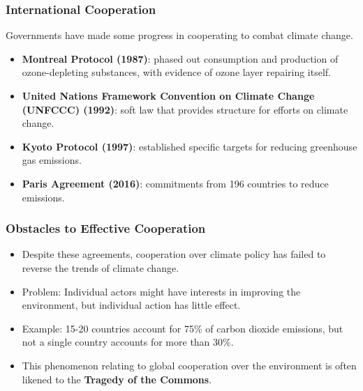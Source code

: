 \documentclass[handout]{beamer}
\begin{document}
\begin{frame} 
	\frametitle{\LARGE{International Cooperation}}
	Governments have made some progress in cooperating to combat climate change.
	\begin{itemize}
		
		\item \textbf{Montreal Protocol (1987)}: phased out consumption and production of ozone-depleting substances, with evidence of ozone layer repairing itself. \pause 
		
		\item \textbf{United Nations Framework Convention on Climate Change (UNFCCC) (1992)}: soft law that provides structure for efforts on climate change. \pause
		
		\item \textbf{Kyoto Protocol (1997)}: established specific targets for reducing greenhouse gas emissions. \pause
		
		\item \textbf{Paris Agreement (2016)}: commitments from 196 countries to reduce emissions.
		
	\end{itemize}
\end{frame}

\begin{frame} 
	\frametitle{\LARGE{Obstacles to Effective Cooperation}}
	\begin{itemize}
		\item Despite these agreements, cooperation over climate policy has failed to reverse the trends of climate change. \pause
		
		\item Problem: Individual actors might have interests in improving the environment, but individual action has little effect. \pause
		
		\item Example: 15-20 countries account for 75\% of carbon dioxide emissions, but not a single country accounts for more than 30\%. \pause 
		
		\item This phenomenon relating to global cooperation over the environment is often likened to the \textbf{Tragedy of the Commons}.
		
	\end{itemize}
\end{frame}
\end{document}
